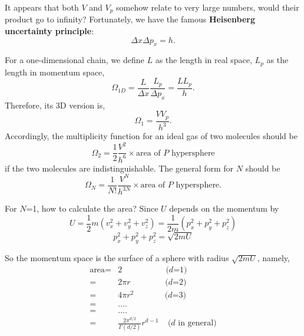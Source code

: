 It appears that both $V$ and $V_p$ somehow relate to very large numbers, would their product go to infinity? 
Fortunately, we have the famous {\bf Heisenberg uncertainty principle}:
\begin{equation} \Delta{x}\Delta{p_x} = h. \end{equation}

For a one-dimensional chain, we define $L$ as the length in real space, $L_p$ as the length in momentum space,
\begin{equation} \Omega_{1D} = \frac{L}{\Delta{x}} \frac{L_p}{\Delta{p_x}} = \frac{LL_p}{h}. \end{equation}
Therefore, its 3D version is,
\begin{equation} \Omega_1 = \frac{VV_p}{h^3}. \end{equation}
Accordingly, the multiplicity function for an ideal gas of two molecules should be
\begin{equation} 
\Omega_2 = \frac{1}{2}\frac{V^2}{h^6} \times \text{area of $P$ hypersphere}
\end{equation}
if the two molecules are indistinguishable.
The general form for $N$ should be 
\begin{equation} \Omega_N = \frac{1}{N!}\frac{V^N}{h^{3N}} \times \text{area of $P$ hypersphere}. \end{equation}

For $N$=1, how to calculate the area?
Since $U$ depends on the momentum by
\begin{equation}
U = \frac{1}{2}m(v_x^2+v_y^2+v_z^2)=\frac{1}{2m}(p_x^2+p_y^2+p_z^2)
\end{equation}
\begin{equation}
p_x^2+p_y^2+p_z^2 = \sqrt{2mU}
\end{equation}

So the momentum space is the surface of a sphere with radius $\sqrt{2mU}$, namely,
\begin{equation}
\begin{split}
\text{area} = & 2    ~~~~~~~~~~~~~~~~~~~~~~~~\text {($d$=1)}\\
            = & 2\pi r    ~~~~~~~~~~~~~~~~~~~\text {($d$=2)}\\
            = & 4\pi r^2    ~~~~~~~~~~~~~~~~~\text {($d$=3)}\\
            = & ....\\
            = & ....\\
            = & \frac{2\pi^{d/2}}{\Gamma(d/2)} r^{d-1} ~~~~~\text {($d$ in general)}\\
\end{split}
\end{equation}

